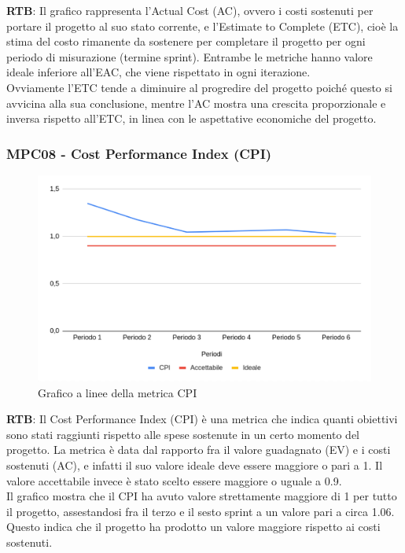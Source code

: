 \documentclass[10pt]{article}
\begin{document}
\begin{justify}
\textbf{RTB}: Il grafico rappresenta l'Actual Cost (AC), ovvero i costi sostenuti per portare il progetto al suo stato corrente, e l'Estimate to Complete (ETC), 
cioè la stima del costo rimanente da sostenere per completare il progetto per ogni periodo di misurazione (termine sprint). Entrambe le metriche hanno valore ideale
inferiore all'EAC, che viene rispettato in ogni iterazione.\\
Ovviamente l'ETC tende a diminuire al progredire del progetto poiché questo si avvicina alla sua conclusione, mentre l'AC mostra una crescita proporzionale e inversa 
rispetto all'ETC, in linea con le aspettative economiche del progetto.

\subsubsection{MPC08 - Cost Performance Index (CPI)}

\begin{figure}[H]
  \centering
  \includegraphics[width=0.9\linewidth]{CPI.png}
  \caption{Grafico a linee della metrica CPI}
  \label{fig:CPIchart}
\end{figure}

\textbf{RTB}: Il Cost Performance Index (CPI) è una metrica che indica quanti obiettivi sono stati raggiunti rispetto alle spese sostenute in un certo momento del
progetto. La metrica è data dal rapporto fra il valore guadagnato (EV) e i costi sostenuti (AC), e infatti il suo valore ideale deve essere maggiore o pari a 1.
Il valore accettabile invece è stato scelto essere maggiore o uguale a 0.9.\\
Il grafico mostra che il CPI ha avuto valore strettamente maggiore di 1 per tutto il progetto, assestandosi fra il terzo e il sesto sprint a un valore pari a circa 1.06.
Questo indica che il progetto ha prodotto un valore maggiore rispetto ai costi sostenuti.



\end{justify}
\end{document}
